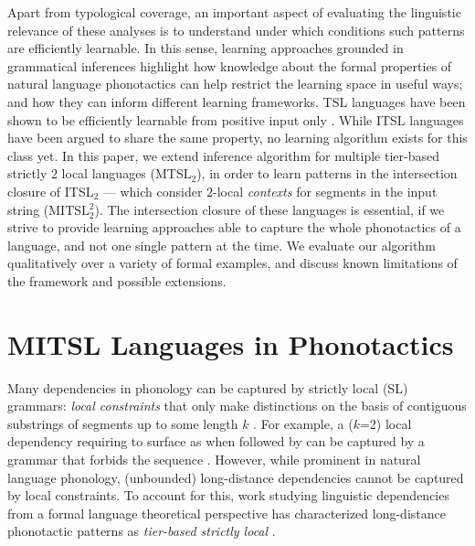 \documentclass[11pt,a4paper]{article}
\begin{document}
Apart from typological coverage, an important aspect of evaluating the linguistic relevance of these analyses is to understand under which conditions such patterns are efficiently learnable.
In this sense, learning approaches grounded in grammatical inferences highlight how knowledge about the formal properties of natural language phonotactics can help restrict the learning space in useful ways; and how they can inform different learning frameworks.
TSL languages have been shown to be efficiently learnable from positive input only \cite{JardineHeinz16,jardinemcmullin17}.
While ITSL languages have been argued to share the same property, no learning algorithm exists for this class yet.
In this paper, we extend \citet{McMullinSCIL2019} inference algorithm for multiple tier-based strictly $2$ local languages (MTSL$_2$), in order to learn patterns in the intersection closure of ITSL$_2$ --- which consider $2$-local \emph{contexts} for segments in the input string (MITSL$^2_2$). 
The intersection closure of these languages is essential, if we strive to provide learning approaches able to capture the whole phonotactics of a language, and not one single pattern at the time.
We evaluate our algorithm qualitatively over a variety of formal examples, and discuss known limitations of the framework and possible extensions.

\section{MITSL Languages in Phonotactics}
\label{sec:MITSL}


Many dependencies in phonology can be captured by strictly local (SL) grammars: \emph{local constraints} that only make distinctions on the basis of contiguous substrings of segments up to some length $k$ \citep[essentially, $k$-grams;][]{Heinz2011a}.
For example, a ($k$=2) local dependency requiring  to surface as \textipa{[z]} when followed by \textipa{[l]} can be captured by a grammar that forbids the sequence \textipa{[sl]}.
However, while prominent in natural language phonology, (unbounded) long-distance dependencies cannot be captured by local constraints.
To account for this, work studying linguistic dependencies from a formal language theoretical perspective has characterized long-distance phonotactic patterns  as \emph{tier-based strictly local} \citep[TSL;][]{HeinzRawalTanner}.
\end{document}
